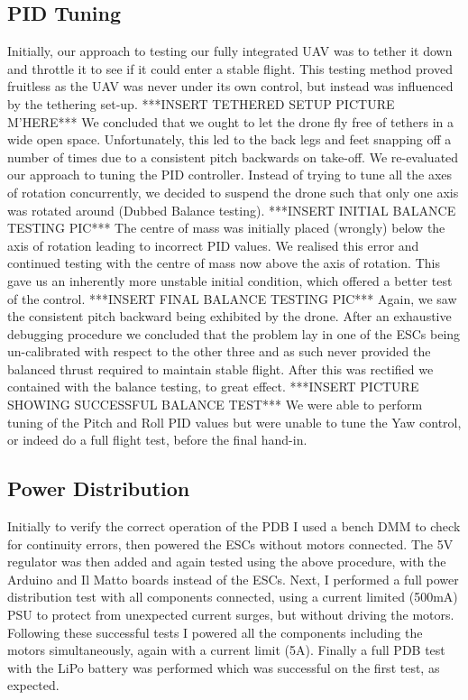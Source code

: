 \documentclass[a4paper,11pt]{article}
\begin{document}
\subsection{PID Tuning}
Initially, our approach to testing our fully integrated UAV was to tether it down and throttle it to see if it could enter a stable flight. This testing method proved fruitless as the UAV was never under its own control, but instead was influenced by the tethering set-up.
***INSERT TETHERED SETUP PICTURE M'HERE***
 We concluded that we ought to let the drone fly free of tethers in a wide open space. Unfortunately, this led to the back legs and feet snapping off a number of times due to a consistent pitch backwards on take-off. We re-evaluated our approach to tuning the PID controller. Instead of trying to tune all the axes of rotation concurrently, we decided to suspend the drone such that only one axis was rotated around (Dubbed Balance testing).
***INSERT INITIAL BALANCE TESTING PIC***
  The centre of mass was initially placed (wrongly) below the axis of rotation leading to incorrect PID values. We realised this error and continued testing with the centre of mass now above the axis of rotation. This gave us an inherently more unstable initial condition, which offered a better test of the control.
***INSERT FINAL BALANCE TESTING PIC***
   Again, we saw the consistent pitch backward being exhibited by the drone. After an exhaustive debugging procedure we concluded that the problem lay in one of the ESCs being un-calibrated with respect to the other three and as such never provided the balanced thrust required to maintain stable flight. After this was rectified we contained with the balance testing, to great effect.
***INSERT PICTURE SHOWING SUCCESSFUL BALANCE TEST***
    We were able to perform tuning of the Pitch and Roll PID values but were unable to tune the Yaw control, or indeed do a full flight test, before the final hand-in.
\subsection{Power Distribution}
 Initially to verify the correct operation of the PDB I used a bench DMM to check for continuity errors, then powered the ESCs without motors connected. The 5V regulator was then added and again tested using the above procedure, with the Arduino and Il Matto boards instead of the ESCs. Next, I performed a full power distribution test with all components connected, using a current limited (500mA) PSU to protect from unexpected current surges, but without driving the motors. Following these successful tests I powered all the components including the motors simultaneously, again with a current limit (5A). Finally a full PDB test with the LiPo battery was performed which was successful on the first test, as expected.
\end{document}
